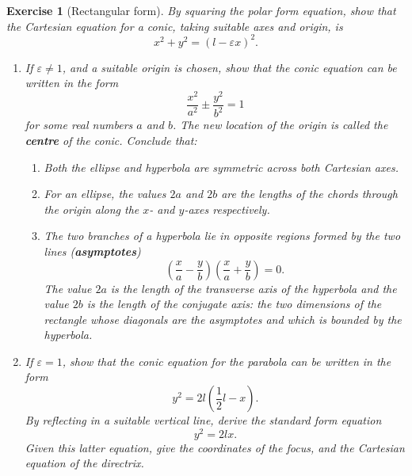 \documentclass[a4paper,leqno,9pt]{article}
\theoremstyle{exercise}
\newtheorem{exercise}{Exercise}
\theoremstyle{plain}
\theoremstyle{definition}
\newcommand{\df}[1]{\textbf{#1}}
\begin{document}
\begin{exercise}[Rectangular form]
  By squaring the polar form equation, show that the Cartesian equation for a conic, taking suitable axes and origin, is
  \begin{displaymath}
    x^2 + y^2 = (l - \varepsilon x)^2.
  \end{displaymath}
  \begin{enumerate}
    \item If $ \varepsilon \neq 1 $, and a suitable origin is chosen, show that the conic equation can be written in the form
          \begin{displaymath}
            \frac{x^2}{a^2} \pm \frac{y^2}{b^2} = 1
          \end{displaymath}
          for some real numbers $ a $ and $ b $. The new location of the origin is called the \df{centre} of the conic. Conclude that:
          \begin{enumerate}
            \item Both the ellipse and hyperbola are symmetric across both Cartesian axes.
            \item For an ellipse, the values $ 2a $ and $ 2b $ are the lengths of the chords through the origin along the $ x$- and $ y$-axes respectively.
            \item The two branches of a hyperbola lie in opposite regions formed by the two lines (\df{asymptotes})
                    \begin{displaymath}
                      \left(\frac{x}{a} - \frac{y}{b} \right)\left(\frac{x}{a} + \frac{y}{b} \right) = 0.
                    \end{displaymath}
                    The value $ 2a $ is the length of the transverse axis of the hyperbola and the value $ 2b $ is the length of the conjugate
                    axis: the two dimensions of the rectangle whose diagonals are the asymptotes and which is bounded by the hyperbola.
          \end{enumerate}
    \item If $ \varepsilon = 1 $, show that the conic equation for the parabola can be written in the form
          \begin{displaymath}
            y^2 = 2l(\frac{1}{2}l - x).
          \end{displaymath}
          By reflecting in a suitable vertical line, derive the standard form equation
          \begin{displaymath}
            y^2 = 2lx.
          \end{displaymath}
          Given this latter equation, give the coordinates of the focus, and the Cartesian equation of the directrix.
  \end{enumerate}
\end{exercise}
\end{document}
